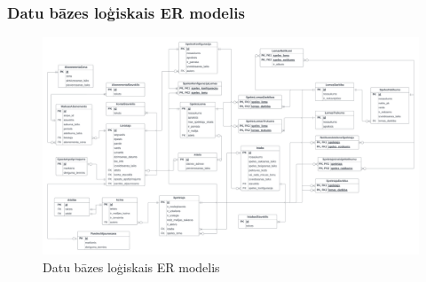 \subsubsection{Datu bāzes loģiskais ER modelis}
\begin{figure}[htbp]
	\centering
	\includegraphics[width=\linewidth]{./src/img/LogiskaisERDModelis.png}
	\caption{Datu bāzes loģiskais ER modelis}
	\label{fig:logical-model}
\end{figure}
